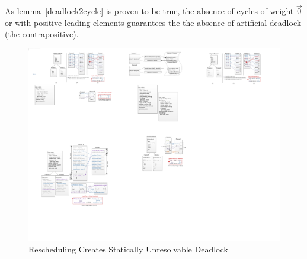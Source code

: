 As lemma~\ref{deadlock2cycle} is proven to be true, the absence of cycles of
weight $\vec{0}$ or with positive leading elements guarantees the the absence of artificial deadlock (the contrapositive).

\begin{figure}[htp]
\begin{center}
\includegraphics[width=1.0\linewidth]{chap4fig/unresolve.pdf}
\caption{Rescheduling Creates Statically Unresolvable Deadlock
\label{fig:badsitu}}
\end{center}
\end{figure}

